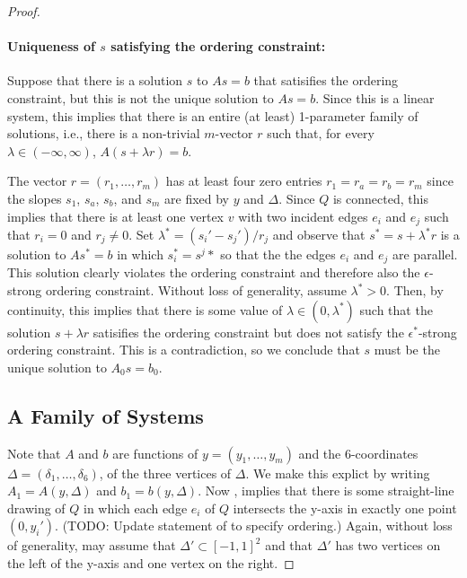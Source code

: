 \documentclass{patmorin}
\begin{document}
\begin{proof}
   \paragraph{Uniqueness of $s$ satisfying the ordering constraint:}

   Suppose that there is a solution $s$ to $As=b$ that satisifies the
   ordering constraint, but this is not the unique solution to $As=b$.
   Since this is a linear system, this implies that there is an entire
   (at least) 1-parameter family of solutions, i.e., there is a non-trivial
   $m$-vector $r$ such that, for every $\lambda\in(-\infty,\infty)$,
   $A(s+\lambda r)=b$.  

   The vector $r=(r_1,\ldots,r_m)$ has at least four
   zero entries $r_1=r_a=r_b=r_m$ since the slopes $s_1$, $s_a$, $s_b$,
   and $s_m$ are fixed by $y$ and $\Delta$.  Since $Q$ is connected, this
   implies that there is at least one vertex $v$ with two incident edges
   $e_i$ and $e_j$ such that $r_i=0$ and $r_j\neq 0$.  Set $\lambda^* =
   (s_i'-s_j')/r_j$ and observe that $s^*=s+\lambda^* r$ is a solution to
   $As^*=b$ in which $s_i^*=s^j*$ so that the the edges $e_i$ and $e_j$
   are parallel.  This solution clearly violates the ordering constraint
   and therefore also the $\epsilon$-strong ordering constraint.  Without
   loss of generality, assume $\lambda^* >0$. Then, by continuity, this
   implies that there is some value of $\lambda\in (0,\lambda^*)$ such
   that the solution $s+\lambda r$ satisifies the ordering constraint
   but does not satisfy the $\epsilon^*$-strong ordering constraint.
   This is a contradiction, so we conclude that $s$ must be the unique
   solution to $A_0s=b_0$.

   \subsection{A Family of Systems}

   Note that $A$ and $b$ are functions of $y=(y_1,\ldots,y_m)$
   and the 6-coordinates $\Delta=(\delta_1,\ldots,\delta_6)$, of
   the three vertices of $\Delta$.  We make this explict by writing
   $A_1=A(y,\Delta)$ and $b_1=b(y,\Delta)$.  Now , implies
   that there is some straight-line drawing of $Q$ in which each edge
   $e_i$ of $Q$ intersects the y-axis in exactly one point $(0,y_i')$.
   (TODO: Update statement of  to specify ordering.)  Again,
   without loss of generality, may assume that $\Delta'\subset [-1,1]^2$
   and that $\Delta'$ has two vertices on the left of the y-axis and
   one vertex on the right.


\end{proof}
\end{document}
